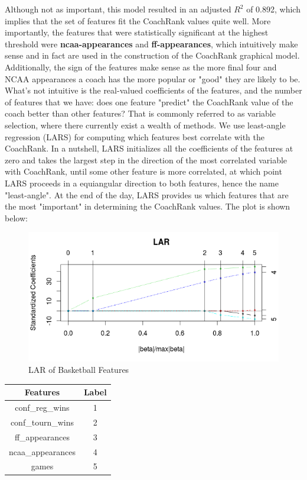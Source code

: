 \documentclass[11pt,notitlepage]{article}
\begin{document}
\vspace{2 mm}

\noindent Although not as important, this model resulted in an adjusted $R^2$ of 0.892, which implies that the set of features fit the CoachRank values quite well. More importantly, the features that were statistically significant at the highest threshold were \textbf{ncaa-appearances} and \textbf{ff-appearances}, which intuitively make sense and in fact are used in the construction of the CoachRank graphical model. Additionally, the sign of the features make sense as the more final four and NCAA appearances a coach has the more popular or "good" they are likely to be. What's not intuitive is the real-valued coefficients of the features, and the number of features that we have: does one feature "predict" the CoachRank value of the coach better than other features? That is commonly referred to as variable selection, where there currently exist a wealth of methods. We use least-angle regression (LARS) for computing which features best correlate with the CoachRank. In a nutshell, LARS initializes all the coefficients of the features at zero and takes the largest step in the direction of the most correlated variable with CoachRank, until some other feature is more correlated, at which point LARS proceeds in a equiangular direction to both features, hence the name "least-angle". At the end of the day, LARS provides us which features that are the most "important" in determining the CoachRank values. The plot is shown below:

\begin{figure}[H]
      \caption{LAR of Basketball Features}
      \centering
      \includegraphics[width=1.0\textwidth]{fixedplot.png}
\end{figure}

\begin{center}
\begin{tabular}{ | c | c |}
\hline
Features            & Label \\\hline
conf\_reg\_wins      & 1      \\\hline
conf\_tourn\_wins     & 2     \\\hline
ff\_appearances      &  3    \\\hline
ncaa\_appearances    & 4      \\\hline
games               & 5      \\
\hline
\end{tabular}
\end{center}
\end{document}
